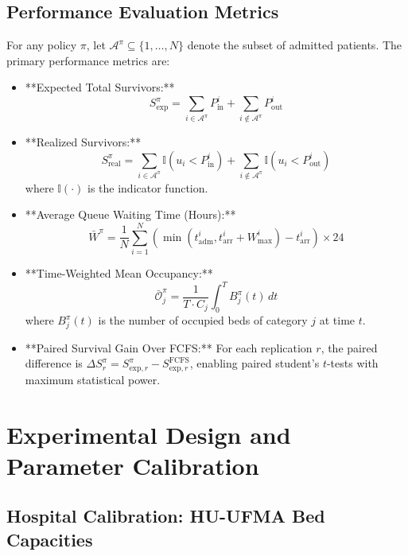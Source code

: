 \documentclass{ro}
\begin{document}
\subsection{Performance Evaluation Metrics}

For any policy $\pi$, let $\mathcal{A}^{\pi} \subseteq \{1, \dots, N\}$ denote the subset of admitted patients. The primary performance metrics are:
\begin{itemize}
    \item **Expected Total Survivors:**
    \begin{equation}
        S_{\text{exp}}^{\pi} = \sum_{i \in \mathcal{A}^{\pi}} P_{\text{in}}^i + \sum_{i \notin \mathcal{A}^{\pi}} P_{\text{out}}^i
    \end{equation}
    \item **Realized Survivors:**
    \begin{equation}
        S_{\text{real}}^{\pi} = \sum_{i \in \mathcal{A}^{\pi}} \mathbb{I}(u_i < P_{\text{in}}^i) + \sum_{i \notin \mathcal{A}^{\pi}} \mathbb{I}(u_i < P_{\text{out}}^i)
    \end{equation}
    where $\mathbb{I}(\cdot)$ is the indicator function.
    \item **Average Queue Waiting Time (Hours):**
    \begin{equation}
        \bar{W}^{\pi} = \frac{1}{N} \sum_{i=1}^N \left( \min(t_{\text{adm}}^i, t_{\text{arr}}^i + W_{\max}^i) - t_{\text{arr}}^i \right) \times 24
    \end{equation}
    \item **Time-Weighted Mean Occupancy:**
    \begin{equation}
        \bar{\mathcal{O}}_j^{\pi} = \frac{1}{T \cdot C_j} \int_0^T B_j^{\pi}(t) \, dt
    \end{equation}
    where $B_j^{\pi}(t)$ is the number of occupied beds of category $j$ at time $t$.
    \item **Paired Survival Gain Over FCFS:**
    For each replication $r$, the paired difference is $\Delta S_r^{\pi} = S_{\text{exp}, r}^{\pi} - S_{\text{exp}, r}^{\text{FCFS}}$, enabling paired student's $t$-tests with maximum statistical power.
\end{itemize}

\section{Experimental Design and Parameter Calibration}
\label{sec:experiments}

\subsection{Hospital Calibration: HU-UFMA Bed Capacities}
\end{document}
